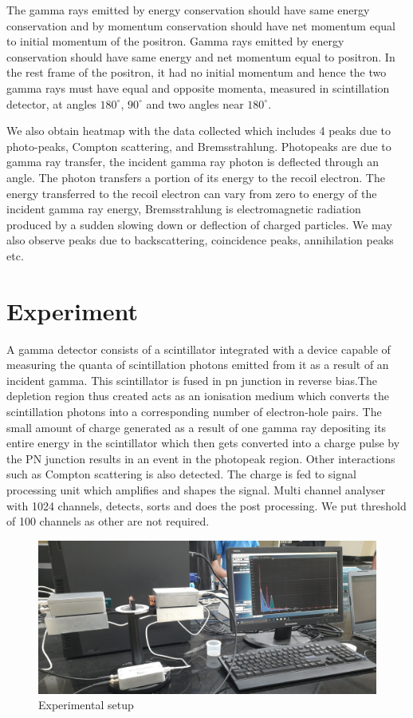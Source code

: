 \documentclass[a4paper, amsfonts, amssymb, amsmath, reprint, showkeys, nofootinbib, twoside]{revtex4-1}
\begin{document}
The gamma rays emitted by energy conservation should have same energy conservation and by momentum conservation should have net momentum equal to  initial momentum of the positron. Gamma rays emitted by energy conservation should have same energy and net momentum equal to positron. In the rest frame of the positron,  it had no initial momentum and hence the two gamma rays must have equal and opposite momenta, measured in scintillation detector, at angles $180^{\circ}$, $90^{\circ}$ and two angles near $180^{\circ}$.

We also obtain heatmap with the data collected which includes 4 peaks due to photo-peaks, Compton scattering, and Bremsstrahlung. Photopeaks are due to gamma ray transfer, the incident gamma ray photon is deflected through an angle. The photon transfers a portion of its energy to the recoil electron. The energy transferred to the recoil electron can vary from zero to energy of the incident gamma ray energy, Bremsstrahlung is electromagnetic radiation produced by a sudden slowing down or deflection of charged particles. We may also observe peaks due to backscattering, coincidence peaks, annihilation peaks etc.

\section{Experiment}
A gamma detector consists of a scintillator integrated with a device capable of measuring the quanta of scintillation photons emitted from it as a result of an incident gamma. This scintillator is fused in pn junction in reverse bias.The depletion region thus created acts as an ionisation medium which converts the scintillation photons into a corresponding number of electron-hole pairs. The small amount of charge generated as a result of one gamma ray depositing its entire energy in the scintillator which then gets converted into a charge pulse by the PN junction results in an event in the photopeak region. Other interactions such as Compton scattering is also detected. The charge is fed to signal processing unit which amplifies and shapes the signal. Multi channel analyser with 1024 channels, detects, sorts and does the post processing. We put threshold of 100 channels as other are not required.

\begin{figure}[H]
	\centering
	\includegraphics[scale=0.06]{2} 
	\caption{Experimental setup}
	\label{s}
\end{figure}
\end{document}
